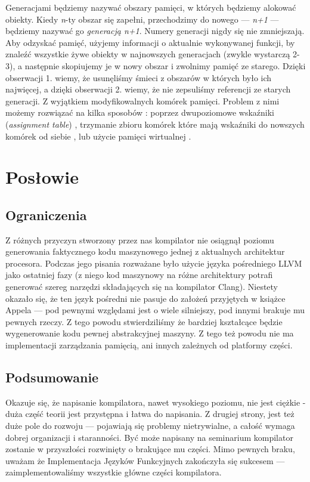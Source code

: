 \documentclass[11pt]{scrartcl}
\begin{document}
Generacjami będziemy nazywać obszary pamięci, w których będziemy alokować
obiekty. Kiedy \textit{n}-ty obszar się zapełni, przechodzimy do nowego --- \textit{n+1} --- będziemy
nazywać go \textit{generacją n+1}. Numery generacji nigdy się nie zmniejszają. Aby
odzyskać pamięć, użyjemy informacji o aktualnie wykonywanej funkcji, by znaleźć
wszystkie żywe obiekty w najnowszych generacjach (zwykle wystarczą 2-3), a
następnie skopiujemy je w nowy obszar i zwolnimy pamięć ze starego. Dzięki
obserwacji 1. wiemy, że usunęliśmy śmieci z obszarów w których było ich
najwięcej, a dzięki obserwacji 2. wiemy, że nie zepsuliśmy referencji ze starych
generacji. Z wyjątkiem modyfikowalnych komórek pamięci. Problem z nimi  możemy
rozwiązać na kilka sposobów \cite{Appel16.3}: poprzez dwupoziomowe wskaźniki (\textit{assignment
table}) \cite{Lieberman83}, trzymanie zbioru komórek które mają wskaźniki do nowszych komórek od
siebie \cite{Shaw87}, lub użycie pamięci wirtualnej \cite{Ungar86}.


\section{Posłowie}
\subsection{Ograniczenia}
Z różnych przyczyn stworzony przez nas kompilator nie osiągnął poziomu
generowania faktycznego kodu maszynowego jednej z aktualnych architektur
procesora. Podczas jego pisania rozważane było użycie języka pośredniego LLVM
jako ostatniej fazy (z niego kod maszynowy na różne architektury potrafi
generować szereg narzędzi składających się na kompilator Clang). Niestety
okazało się, że ten język pośredni nie pasuje do założeń przyjętych w książce
Appela --- pod pewnymi względami jest o wiele silniejszy, pod innymi brakuje mu
pewnych rzeczy. Z tego powodu stwierdziliśmy że bardziej kształcące będzie
wygenerowanie kodu pewnej abstrakcyjnej maszyny. Z tego też powodu nie ma
implementacji zarządzania pamięcią, ani innych zależnych od platformy części.

\subsection{Podsumowanie}
Okazuje się, że napisanie kompilatora, nawet wysokiego poziomu, nie jest ciężkie
- duża część teorii jest przystępna i łatwa do napisania. Z drugiej strony, jest
też duże pole do rozwoju --- pojawiają się problemy nietrywialne, a całość
wymaga dobrej organizacji i staranności. Być może napisany na seminarium
kompilator zostanie w przyszłości rozwinięty o brakujące mu części. Mimo pewnych
braku, uważam że Implementacja Języków Funkcyjnych zakończyła się sukcesem ---
zaimplementowaliśmy wszystkie główne części kompilatora.



\end{document}
